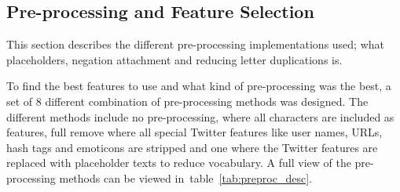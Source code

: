 \subsection{Pre-processing and Feature Selection}

This section describes the different pre-processing implementations used; what placeholders, negation attachment and reducing letter duplications is.

To find the best features to use and what kind of pre-processing was the best, a set of 8 different combination of pre-processing methods was designed. The different methods include no pre-processing, where all characters are included as features, full remove where all special Twitter features like user names, URLs, hash tags and emoticons are stripped and one where the Twitter features are replaced with placeholder texts to reduce vocabulary. A full view of the pre-processing methods can be viewed in~table~\ref{tab:preproc_desc}.

